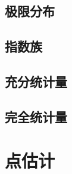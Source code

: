\documentclass[UTF8]{ctexart}
\begin{document}
\subsection{极限分布}

\subsection{指数族}

\subsection{充分统计量}

\subsection{完全统计量}

\section{点估计}
\end{document}
